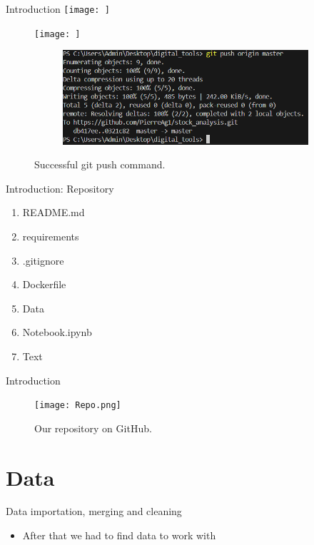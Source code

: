 \documentclass{beamer}
\begin{document}
\begin{frame}{Introduction}
\texttt{[image: ]}
\begin{figure}
        \centering
        \texttt{[image: ]}
\begin{figure}
            \centering
            \includegraphics[width=1\linewidth]{gitpush.png}
        \end{figure}
                \caption{Successful git push command. }
        \label{fig:enter-label}
    \end{figure} 
\end{frame}


\begin{frame}{Introduction: Repository}
\begin{enumerate}
    \item <1-> README.md
    \item <2->requirements
    \item <3->.gitignore
    \item <4->Dockerfile
    \item <5->Data
    \item <6->Notebook.ipynb
    \item <7->Text
    
\end{enumerate}
\end{frame}

\begin{frame}{Introduction}
\begin{figure}
    \centering
    \texttt{[image: Repo.png]}
    \caption{Our repository on GitHub.}
    \label{fig:enter-label}
\end{figure}
    
\end{frame}


\section{Data}

\begin{frame}{Data importation, merging and cleaning}
  \begin{itemize}
      \item <1->After that we had to find data to work with
  \end{itemize}
    
\end{frame}
\end{document}
